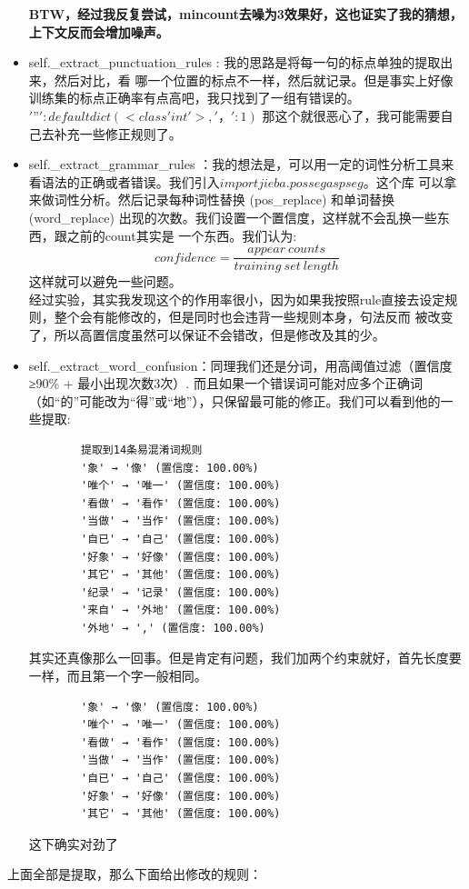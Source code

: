 \documentclass[answers]{exam}  %
\begin{document}
\begin{itemize}
    \textbf{BTW，经过我反复尝试，mincount去噪为3效果好，这也证实了我的猜想，上下文反而会增加噪声。}
    \item self.\_extract\_punctuation\_rules : 我的思路是将每一句的标点单独的提取出来，然后对比，看
    哪一个位置的标点不一样，然后就记录。但是事实上好像训练集的标点正确率有点高吧，我只找到了一组有错误的。${'”': defaultdict(<class 'int'>, {'，': 1})}$
    那这个就很恶心了，我可能需要自己去补充一些修正规则了。
    \item self.\_extract\_grammar\_rules ：我的想法是，可以用一定的词性分析工具来看语法的正确或者错误。我们引入$import jieba.posseg as pseg$。这个库
    可以拿来做词性分析。然后记录每种词性替换 (pos\_replace) 和单词替换 (word\_replace) 出现的次数。我们设置一个置信度，这样就不会乱换一些东西，跟之前的count其实是
    一个东西。我们认为:
    \[confidence = \frac{appear\ counts}{training\ set\ length} \]
    这样就可以避免一些问题。\\
    经过实验，其实我发现这个的作用率很小，因为如果我按照rule直接去设定规则，整个会有能修改的，但是同时也会违背一些规则本身，句法反而
    被改变了，所以高置信度虽然可以保证不会错改，但是修改及其的少。
    \item self.\_extract\_word\_confusion：同理我们还是分词，用高阈值过滤（置信度≥90\% + 最小出现次数3次）.
    而且如果一个错误词可能对应多个正确词（如“的”可能改为“得”或“地”），只保留最可能的修正。我们可以看到他的一些提取:
    \begin{lstlisting}
        提取到14条易混淆词规则
        '象' → '像' (置信度: 100.00%)
        '唯个' → '唯一' (置信度: 100.00%)
        '看做' → '看作' (置信度: 100.00%)
        '当做' → '当作' (置信度: 100.00%)
        '自已' → '自己' (置信度: 100.00%)
        '好象' → '好像' (置信度: 100.00%)
        '其它' → '其他' (置信度: 100.00%)
        '纪录' → '记录' (置信度: 100.00%)
        '来自' → '外地' (置信度: 100.00%)
        '外地' → ',' (置信度: 100.00%) 
    \end{lstlisting}
    其实还真像那么一回事。但是肯定有问题，我们加两个约束就好，首先长度要一样，而且第一个字一般相同。
    \begin{lstlisting}
        '象' → '像' (置信度: 100.00%)
        '唯个' → '唯一' (置信度: 100.00%)
        '看做' → '看作' (置信度: 100.00%)
        '当做' → '当作' (置信度: 100.00%)
        '自已' → '自己' (置信度: 100.00%)
        '好象' → '好像' (置信度: 100.00%)
        '其它' → '其他' (置信度: 100.00%)
    \end{lstlisting}这下确实对劲了
\end{itemize}
上面全部是提取，那么下面给出修改的规则：
\end{document}
